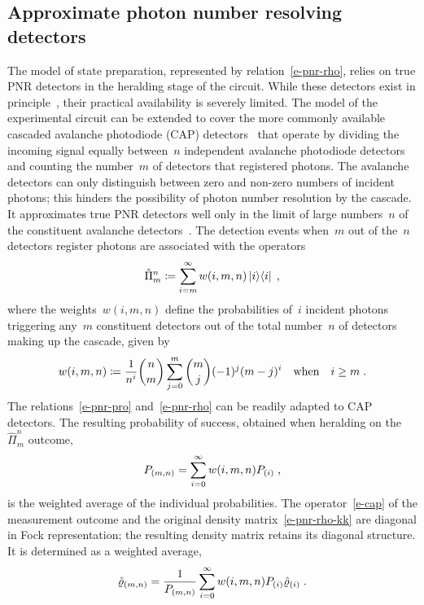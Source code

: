 \documentclass{article}
\begin{document}
\subsection*{Approximate photon number resolving detectors}

The model of state preparation, represented by relation~\eqref{e-pnr-rho}, relies on true PNR detectors in the heralding stage of the circuit. While these detectors exist in principle~\cite{hopker2019,endo2021,endo2024}, their practical availability is severely limited. The model of the experimental circuit can be extended to cover the more commonly available cascaded avalanche photodiode (CAP) detectors~\cite{hlousek2019,grygar2022,hlousek2024,ercolano2024} that operate by dividing the incoming signal equally between~$n$ independent avalanche photodiode detectors and counting the number~$m$ of detectors that registered photons. The avalanche detectors can only distinguish between zero and non-zero numbers of incident photons; this hinders the possibility of photon number resolution by the cascade. It approximates true PNR detectors well only in the limit of large numbers~$n$ of the constituent avalanche detectors~\cite{provaznik2020}. The detection events when~$m$ out of the~$n$ detectors register photons are associated with the operators~\cite{paul1996}
%
\begin{equation}\label{e-cap}
  \hat{\Pi}_{m}^{n} 
    \coloneqq \sum_{i = m}^{\infty} w(i, m, n) \ketbra{i}{i} \Qc
\end{equation}
%
where the weights~$w(i, m, n)$ define the probabilities of~$i$ incident photons triggering any~$m$ constituent detectors out of the total number~$n$ of detectors making up the cascade, given by
%
\begin{equation}\label{e-cap-w}
  w(i, m, n) \coloneqq 
    \frac{1}{n^{i}} \binom{n}{m} \sum_{j = 0}^{m} \binom{m}{j} (-1)^{j} (m - j)^{i} 
    \quad\text{when}\quad i \geq m \;\text{.}
\end{equation} 
%
The relations~\eqref{e-pnr-pro} and~\eqref{e-pnr-rho} can be readily adapted to CAP detectors. The resulting probability of success, obtained when heralding on the~$\hat{\Pi}_{m}^{n}$ outcome, 
%
\begin{equation}\label{e-cap-pro}
  P_{(m, n)} = \sum_{i = 0}^{\infty} w(i, m, n) P_{(i)} \;\text{,}
\end{equation}
%
is the weighted average of the individual probabilities. The operator~\eqref{e-cap} of the measurement outcome and the original density matrix~\eqref{e-pnr-rho-kk} are diagonal in Fock representation; the resulting density matrix retains its diagonal structure. It is determined as a weighted average,
%
\begin{equation}\label{e-cap-rho-kk}
  \hat{\varrho}_{(m, n)} =
    \frac{1}{ P_{(m,n)} }
    \sum_{i = 0}^{\infty} w(i, m, n) P_{(i)} \hat{\varrho}_{(i)}
  \;\text{.}
\end{equation}
\end{document}
